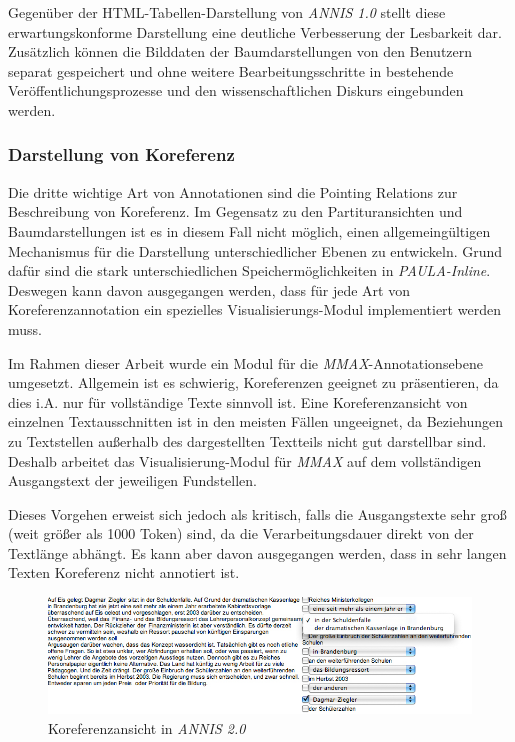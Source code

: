 Gegenüber der HTML-Tabellen-Darstellung von \emph{ANNIS 1.0} stellt diese erwartungskonforme Darstellung eine deutliche Verbesserung der Lesbarkeit dar. Zusätzlich können die Bilddaten der Baumdarstellungen von den Benutzern separat gespeichert und ohne weitere Bearbeitungsschritte in bestehende Veröffentlichungsprozesse und den wissenschaftlichen Diskurs eingebunden werden. 

\newpage
\subsubsection{Darstellung von Koreferenz}\label{sec:Darstellung.Koreferenz}

Die dritte wichtige Art von Annotationen sind die Pointing Relations zur Beschreibung von Koreferenz. Im Gegensatz zu den Partituransichten und Baumdarstellungen ist es in diesem Fall nicht möglich, einen allgemeingültigen Mechanismus für die Darstellung unterschiedlicher Ebenen zu entwickeln. Grund dafür sind die stark unterschiedlichen Speichermöglichkeiten in \emph{PAULA-Inline}. Deswegen kann davon ausgegangen werden, dass für jede Art von Koreferenzannotation ein spezielles Visualisierungs-Modul implementiert werden muss.

Im Rahmen dieser Arbeit wurde ein Modul für die \emph{MMAX}-Annotationsebene umgesetzt. Allgemein ist es schwierig, Koreferenzen geeignet zu präsentieren, da dies i.A. nur für vollständige Texte sinnvoll ist. Eine Koreferenzansicht von einzelnen Textausschnitten ist in den meisten Fällen ungeeignet, da Beziehungen zu Textstellen außerhalb des dargestellten Textteils nicht gut darstellbar sind. Deshalb arbeitet das Visualisierung-Modul für \emph{MMAX} auf dem vollständigen Ausgangstext der jeweiligen Fundstellen.

Dieses Vorgehen erweist sich jedoch als kritisch, falls die Ausgangstexte sehr groß  (weit größer als 1000 Token) sind, da die Verarbeitungsdauer direkt von der Textlänge abhängt. Es kann aber davon ausgegangen werden, dass in sehr langen Texten Koreferenz nicht annotiert ist.

\begin{figure}[H]
	\centering
	\includegraphics*[width=1.0\textwidth]{figures/DA/Screenshot_Koreferenzansicht.jpg}
	\caption{Koreferenzansicht in \emph{ANNIS 2.0}}\label{fig:KoreferenzScreenshot}
\end{figure}

